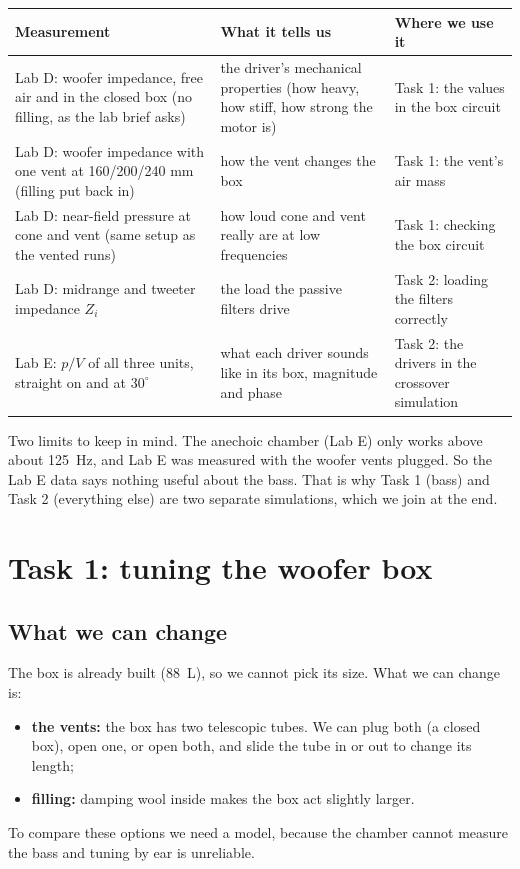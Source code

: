 \documentclass[a4paper,10pt]{article}
\begin{document}
\begin{center}
\begin{tabularx}{\linewidth}{lXX}
\toprule
Measurement & What it tells us & Where we use it \\
\midrule
Lab D: woofer impedance, free air and in the closed box (no filling, as the lab brief asks) & the driver's mechanical properties (how heavy, how stiff, how strong the motor is) & Task 1: the values in the box circuit \\
Lab D: woofer impedance with one vent at 160/200/240 mm (filling put back in) & how the vent changes the box & Task 1: the vent's air mass \\
Lab D: near-field pressure at cone and vent (same setup as the vented runs) & how loud cone and vent really are at low frequencies & Task 1: checking the box circuit \\
Lab D: midrange and tweeter impedance $Z_i$ & the load the passive filters drive & Task 2: loading the filters correctly \\
Lab E: $p/V$ of all three units, straight on and at $30^\circ$ & what each driver sounds like in its box, magnitude and phase & Task 2: the drivers in the crossover simulation \\
\bottomrule
\end{tabularx}
\end{center}

Two limits to keep in mind. The anechoic chamber (Lab E) only works above about \SI{125}{Hz}, and
Lab E was measured with the woofer vents plugged. So the Lab E data says nothing useful about the
bass. That is why Task 1 (bass) and Task 2 (everything else) are two separate simulations, which we
join at the end.

\section{Task 1: tuning the woofer box}

\subsection{What we can change}
The box is already built (\SI{88}{L}), so we cannot pick its size. What we can change is:
\begin{itemize}
\item \textbf{the vents:} the box has two telescopic tubes. We can plug both (a closed box), open one,
  or open both, and slide the tube in or out to change its length;
\item \textbf{filling:} damping wool inside makes the box act slightly larger.
\end{itemize}
To compare these options we need a model, because the chamber cannot measure the bass and tuning
by ear is unreliable.
\end{document}
